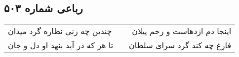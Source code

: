 \begin{center}
\section*{رباعی شماره ۵۰۳}
\label{sec:sh503}
\begin{longtable}{l p{0.5cm} r}
چندین چه زنی نظاره گرد میدان
&&
اینجا دم اژدهاست و زخم پیلان
\\
تا هر که در آید بنهد او دل و جان
&&
فارغ چه کند گرد سرای سلطان
\\
\end{longtable}
\end{center}
